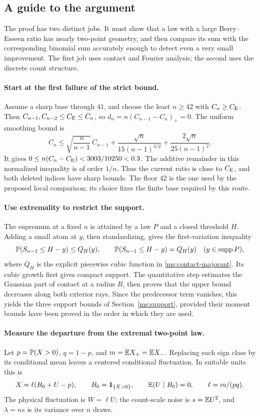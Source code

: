 \subsection{A guide to the argument}\label{ms:guide}

The proof has two distinct jobs. It must show that a law with a large
Berry--Esseen ratio has nearly two-point geometry, and then compare its
sum with the corresponding binomial sum accurately enough to detect even
a very small improvement. The first job uses contact and Fourier
analysis; the second uses the discrete count structure.

\paragraph{Start at the first failure of the strict bound.}
Assume a sharp base through $41$, and choose the least $n\ge42$ with
$C_n\ge C_{\mathrm E}$. Then $C_{n-1},C_{n-2}\le C_{\mathrm E}\le C_n$, so
$d_n=n(C_{n-1}-C_n)_+=0$. The uniform smoothing bound is
\[
 C_n\le\sqrt{\frac n{n-1}}\,C_{n-1}
       +\frac{\sqrt n}{15(n-1)^{3/2}}
       +\frac{2\sqrt n}{25(n-1)^2}.
\]
It gives $0\le n(C_n-C_{\mathrm E})<3003/10250<0.3$.
The additive remainder in this normalized inequality is of order $1/n$.
Thus the current ratio is close to $C_{\mathrm E}$, and both deleted indices have
sharp bounds. The floor $42$ is the one used by the proposed local
comparison; its choice fixes the finite base required by this route.

\paragraph{Use extremality to restrict the support.}
The supremum at a fixed $n$ is attained by a law $P$ and a closed threshold
$H$. Adding a small atom at $y$, then standardizing, gives the
first-variation inequality
\[
 \mathbb P(S_{n-1}\le H-y)\le Q_H(y),\qquad
 \mathbb P(S_{n-1}\le H-y)=Q_H(y)\quad(y\in\operatorname{supp} P),
\]
where $Q_H$ is the explicit piecewise cubic function in
\eqref{ms:contact-majorant}. Its cubic growth first gives compact support.
The quantitative step estimates the Gaussian part of contact at a radius
$R$, then proves that the upper bound decreases along both exterior rays.
Since the predecessor term vanishes, this yields the three support bounds
of Section~\ref{ms:support}, provided their moment bounds have been proved
in the order in which they are used.

\paragraph{Measure the departure from the extremal two-point law.}
Let $p=\mathbb P(X>0)$, $q=1-p$, and $m=\mathbb E X_+=\mathbb E X_-$.
Replacing each sign class by its conditional mean leaves a centered
conditional fluctuation. In suitable units this is
\[
 X=\ell(B_0+U-p),\qquad B_0=\mathbf 1_{\{X>0\}},\qquad
 \mathbb E(U\mid B_0)=0,\qquad \ell=m/(pq).
\]
The physical fluctuation is $W=\ell U$; the count-scale noise is
$s=\mathbb E U^2$, and $\lambda=ns$ is its variance over $n$ draws.

